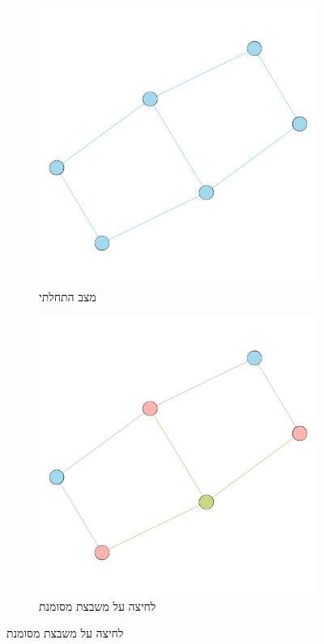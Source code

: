 \documentclass[12pt,leqno]{article}
\theoremstyle{theoremdd}
\begin{document}
\begin{figure}[ht]
    \caption{משחק על גרף לדוגמה}
    \label{fig: start game in graph}
    \begin{subfigure}{.5\textwidth}
        \centering
        \caption{מצב התחלתי}
        \label{subfig: graph game start}
        \includegraphics[scale=0.7]{images/graph_start_board.png}
    \end{subfigure}%
    \begin{subfigure}{.5\textwidth}
        \centering
        \caption{לחיצה על משבצת מסומנת}
        \label{subfig: graph game move}
        \includegraphics[scale=0.7]{images/graph_press.png}
    \end{subfigure}%
\end{figure}
\end{document}
